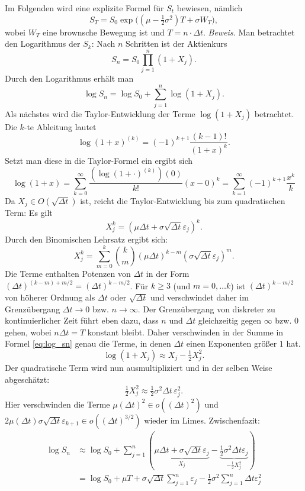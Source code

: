 Im Folgenden wird eine explizite Formel für $S_t$ bewiesen, nämlich
$$S_T = S_0 \exp\!\Big( (\mu - \tfrac12 \sigma^2)T + \sigma W_T \Big),$$
wobei $W_T$ eine brownsche Bewegung ist und $T=n \cdot \Delta t$. \textit{Beweis.}
Man betrachtet den Logarithmus der $S_k$: Nach $n$ Schritten ist der Aktienkurs
$$
S_n = S_0 \prod_{j=1}^n (1 + X_j).
$$
Durch den Logarithmus erhält man
\begin{equation} \label{eq:log_sn}
\log S_n = \log S_0 + \sum_{j=1}^n \log(1+X_j).
\end{equation}
Als nächstes wird die Taylor-Entwicklung der Terme $\log(1+X_j)$ betrachtet. Die $k$-te Ableitung lautet
$$\log(1+x)^{(k)}=(-1)^{k+1} \frac{(k-1)!}{(1+x)^k}.$$
Setzt man diese in die Taylor-Formel ein ergibt sich
$$\log(1+x) = \sum_{k=0}^{\infty} \frac{(\log(1+\cdot)^{(k)})(0)}{k!}(x-0)^k= \sum_{k=1}^\infty(-1)^{k+1} \frac{x^k}{k}$$
Da $X_j \in O(\sqrt{\Delta t})$ ist, reicht die Taylor-Entwicklung bis zum quadratischen Term: Es gilt
$$
X_j^k = (\mu \Delta t + \sigma \sqrt{\Delta t} \varepsilon_j)^k.
$$
Durch den Binomischen Lehrsatz ergibt sich:
$$
X_j^k = \sum_{m=0}^k \binom{k}{m} (\mu \Delta t)^{k-m} (\sigma \sqrt{\Delta t} \varepsilon_j)^m.
$$
Die Terme enthalten Potenzen von $\Delta t$ in der Form $(\Delta t)^{(k-m) + m/2} = (\Delta t)^{k-m/2}$. Für $k \geq 3$ (und $m=0,\dots k$) ist $(\Delta t)^{k-m/2}$ von 
höherer Ordnung als $\Delta t$ oder $\sqrt{\Delta t}$ und verschwindet daher im Grenzübergang $\Delta t \to 0$ bzw. $n \to \infty$. Der Grenzübergang 
von diskreter zu kontinuierlicher Zeit führt eben dazu, dass $n$ und $\Delta t$ gleichzeitig gegen $\infty$ bzw. $0$ gehen, wobei $n \Delta t = T$ konstant bleibt.
Daher verschwinden in der Summe in Formel \ref{eq:log_sn} genau die Terme, in denen $\Delta t$ einen Exponenten größer $1$ hat.
$$
\log(1+X_j) \approx X_j - \tfrac12 X_j^2.
$$
Der quadratische Term wird nun ausmultipliziert und in der selben Weise abgeschätzt:
$$
\tfrac12 X_j^2 \approx \tfrac12 \sigma^2 \Delta t \,\varepsilon_j^2.
$$
Hier verschwinden die Terme $\mu (\Delta t)^2 \in o((\Delta t)^{2})$ und $2 \mu (\Delta t) \sigma \sqrt{\Delta t} \varepsilon_{k+1} \in o((\Delta t)^{3/2})$ wieder im Limes. Zwischenfazit:
$$
\begin{aligned}
\log S_n &\approx \log S_0 + \sum_{j=1}^n\left( \underbrace{\mu \Delta t + \sigma\sqrt{\Delta t} \varepsilon_j}_{X_j} - \underbrace{\frac{1}{2} \sigma^2 \Delta t \varepsilon_j}_{-\frac{1}{2} X_j^2} \right)
\\ &= \log S_0 + \mu T + \sigma\sqrt{\Delta t} \sum_{j=1}^{n} \varepsilon_j - \frac{1}{2} \sigma^2 \sum_{j=1}^{n} \Delta t \varepsilon_j^2 
\end{aligned}
$$
